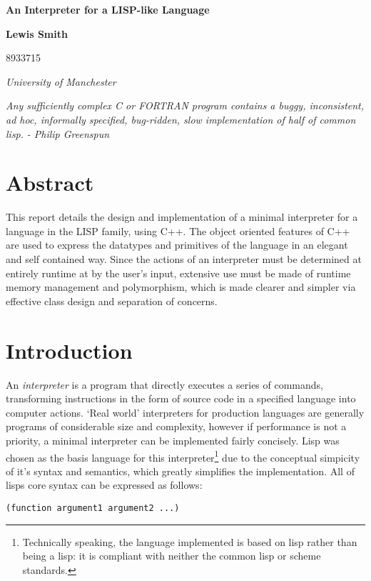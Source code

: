 \documentclass[12pt]{article}
\begin{document}
\lstset{language=Lisp}


\thispagestyle{empty}

\vspace*{15mm}

\begin{center}
{\Large\bf
An Interpreter for a LISP-like Language
}

\vspace*{5mm}

\end{center}
\vspace*{5mm} \noindent
\vskip 0.5cm
\centerline{\bf
Lewis Smith
}
\centerline{
8933715
}

\vskip 5mm
\vskip 5mm
\centerline{\em University of Manchester }
\vskip 5mm

\begin{center}
\textit{
Any sufficiently complex C or FORTRAN program contains a buggy, inconsistent, ad hoc, informally
specified, bug-ridden, slow implementation of half of common lisp.}
\vskip 5mm
\textit{ - Philip Greenspun}
\end{center}


\vskip 20mm
\vskip 20mm
\section*{Abstract}
This report details the design and implementation of a minimal interpreter for a language in the LISP family,
using C++.  The object oriented features of C++ are used to express the datatypes and primitives of the
language in an elegant and self contained way. Since the actions of an interpreter must
be determined at entirely runtime at by the user's input, extensive use must be made of runtime memory
management and polymorphism, which is made clearer and simpler via effective class design and separation of concerns.
\section{ Introduction }

An \textit{interpreter} is a program that directly executes a series of commands, transforming instructions in
the form of source code in a specified language into computer actions. `Real world' interpreters for production languages are generally programs of considerable size and complexity, however if performance is not a priority, a
minimal interpreter can be implemented fairly concisely. Lisp was chosen as the basis language for this interpreter\footnote{Technically speaking, the language implemented is based on lisp rather than being a lisp: it is compliant with neither the common lisp or scheme standards.} due to the conceptual simpicity of it's syntax and semantics, which greatly simplifies the implementation. All of lisps core syntax
can be expressed as follows:
\begin{lstlisting}
(function argument1 argument2 ...)
\end{lstlisting}
\end{document}
